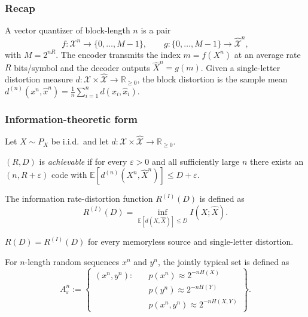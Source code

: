 \subsubsection*{Recap}
A vector quantizer of block-length \(n\) is a pair
\[
f:\mathcal X^{n}\!\longrightarrow\{0,\dots,M\!-\!1\},\qquad
g:\{0,\dots,M\!-\!1\}\!\longrightarrow\widehat{\mathcal X}^{n},
\]
with \(M=2^{nR}\).  
The encoder transmits the index \(m=f(X^{n})\) at an average rate
\(R\) bits/symbol and the decoder outputs
\(\widehat X^{n}=g(m)\).
Given a single-letter distortion measure \(d:\mathcal X\times\widehat{\mathcal X}\!\to\!\mathbb R_{\ge0}\),
the block distortion is the sample mean
\(d^{(n)}(x^{n},\widehat x^{n})=\frac1n\sum_{i=1}^{n}d(x_i,\widehat x_i)\).

\subsubsection*{Information-theoretic form}

Let \(X\sim P_X\) be i.i.d.\ and let
\(d:\mathcal X\times\widehat{\mathcal X}\to\mathbb R_{\ge0}\).

\begin{definition}
\((R,D)\) is \emph{achievable} if for every \(\varepsilon>0\) and all
sufficiently large \(n\) there exists an \((n,R+\varepsilon)\) code
with
\(\displaystyle
\mathbb E[d^{(n)}(X^{n},\widehat X^{n})]\le D+\varepsilon\).
\end{definition}

\begin{definition}
    The information rate-distortion function $R^{(I)}(D)$ is defined as
    \[
    R^{(I)}(D) = \inf_{\mathbb{E}[d(X, \widehat{X})] \leq D} I(X; \widehat{X}).
    \]
\end{definition}

\begin{theorem}\label{thm:shannonRD}
\(R(D)=R^{(I)}(D)\) for every memoryless source and single-letter
distortion.
\end{theorem}

\begin{definition}
    For $n$-length random sequences $x^n$ and $y^n$, the jointly typical set is defined as
    \[
A_\varepsilon^n := 
\left\{
\begin{aligned}
(x^n, y^n):\quad
& p(x^n)       \approx 2^{-nH(X)} \\
& p(y^n)       \approx 2^{-nH(Y)} \\
& p(x^n, y^n)  \approx 2^{-nH(X,Y)}
\end{aligned}
\right\}.
\]
\end{definition}

